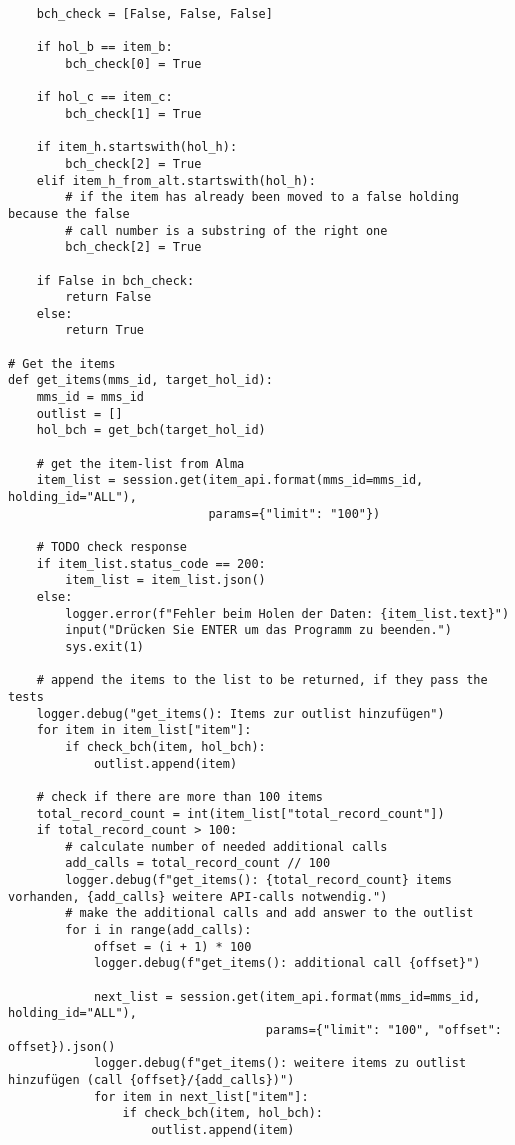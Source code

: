 \documentclass[10pt, a4paper]{scrartcl}
\begin{document}
\begin{verbatim}
    bch_check = [False, False, False]

    if hol_b == item_b:
        bch_check[0] = True

    if hol_c == item_c:
        bch_check[1] = True

    if item_h.startswith(hol_h):
        bch_check[2] = True
    elif item_h_from_alt.startswith(hol_h):
        # if the item has already been moved to a false holding because the false
        # call number is a substring of the right one
        bch_check[2] = True

    if False in bch_check:
        return False
    else:
        return True

# Get the items
def get_items(mms_id, target_hol_id):
    mms_id = mms_id
    outlist = []
    hol_bch = get_bch(target_hol_id)

    # get the item-list from Alma
    item_list = session.get(item_api.format(mms_id=mms_id, holding_id="ALL"),
                            params={"limit": "100"})

    # TODO check response
    if item_list.status_code == 200:
        item_list = item_list.json()
    else:
        logger.error(f"Fehler beim Holen der Daten: {item_list.text}")
        input("Drücken Sie ENTER um das Programm zu beenden.")
        sys.exit(1)

    # append the items to the list to be returned, if they pass the tests
    logger.debug("get_items(): Items zur outlist hinzufügen")
    for item in item_list["item"]:
        if check_bch(item, hol_bch):
            outlist.append(item)

    # check if there are more than 100 items
    total_record_count = int(item_list["total_record_count"])
    if total_record_count > 100:
        # calculate number of needed additional calls
        add_calls = total_record_count // 100
        logger.debug(f"get_items(): {total_record_count} items vorhanden, {add_calls} weitere API-calls notwendig.")
        # make the additional calls and add answer to the outlist
        for i in range(add_calls):
            offset = (i + 1) * 100
            logger.debug(f"get_items(): additional call {offset}")

            next_list = session.get(item_api.format(mms_id=mms_id, holding_id="ALL"),
                                    params={"limit": "100", "offset": offset}).json()
            logger.debug(f"get_items(): weitere items zu outlist hinzufügen (call {offset}/{add_calls})")
            for item in next_list["item"]:
                if check_bch(item, hol_bch):
                    outlist.append(item)


\end{verbatim}
\end{document}
